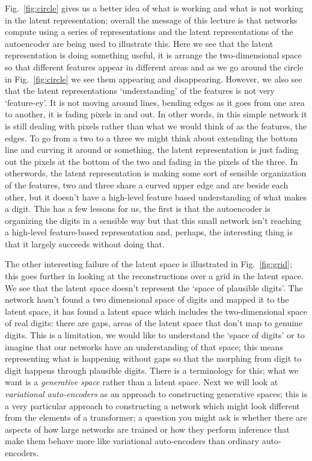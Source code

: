 \documentclass[12pt]{article}
\begin{document}
Fig.~\ref{fig:circle} gives us a better idea of what is working and
what is not working in the latent representation; overall the message
of this lecture is that networks compute using a series of
representations and the latent representations of the autoencoder are
being used to illustrate this. Here we see that the latent
representation is doing something useful, it is arrange the
two-dimensional space so that different features appear in different
areas and as we go around the circle in Fig.~\ref{fig:circle} we see
them appearing and disappearing. However, we also see that the latent
representations `understanding' of the features is not very
`feature-ey'. It is not moving around lines, bending edges as it goes
from one area to another, it is fading pixels in and out. In other
words, in this simple network it is still dealing with pixels rather
than what we would think of as the features, the edges. To go from a
two to a three we might think about extending the bottom line and
curving it around or something, the latent representation is just
fading out the pixels at the bottom of the two and fading in the
pixels of the three. In otherwords, the latent representation is
making some sort of sensible organization of the features, two and
three share a curved upper edge and are beside each other, but it
doesn't have a high-level feature based understanding of what makes a
digit. This has a few lessons for us, the first is that the
autoencoder is organizing the digits in a sensible way but that this
small network isn't reaching a high-level feature-based representation
and, perhaps, the interesting thing is that it largely succeeds
without doing that.

The other interesting failure of the latent space is illustrated in
Fig.~\ref{fig:grid}; this goes further in looking at the
reconstructions over a grid in the latent space. We see that the
latent space doesn't represent the `space of plausible digits'. The
network hasn't found a two dimensional space of digits and mapped it
to the latent space, it has found a latent space which includes the
two-dimensional space of real digits: there are gaps, areas of the
latent space that don't map to genuine digits. This is a limitation,
we would like to understand the `space of digits' or to imagine that
our networks have an understanding of that space; this means
representing what is happening without gaps so that the morphing from
digit to digit happens through plausible digits. There is a
terminology for this; what we want is a \textsl{generative space}
rather than a latent space. Next we will look at \textsl{variational
  auto-encoders} as an approach to constructing generative spaces;
this is a very particular approach to constructing a network which
might look different from the elements of a transformer; a question
you might ask is whether there are aspects of how large networks are
trained or how they perform inference that make them behave more like
variational auto-encoders than ordinary auto-encoders.
\end{document}
